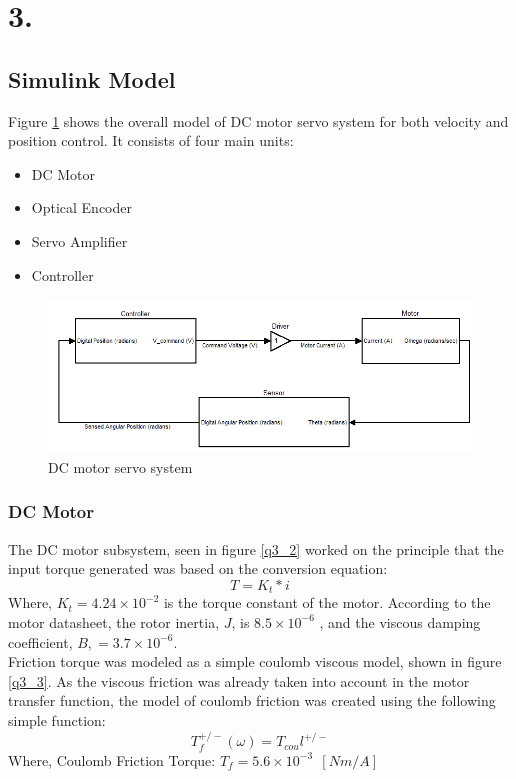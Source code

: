 \documentclass{article}
\theoremstyle{plain}
\theoremstyle{definition}
\theoremstyle{remark}
\begin{document}
\clearpage

\section*{3.}
\subsection*{Simulink Model}
Figure \ref{q3_1} shows the overall model of DC motor servo system for both velocity and position control. It consists of four main units: 
\begin{itemize}
\item DC Motor
\item Optical Encoder 
\item Servo Amplifier 
\item Controller
\end{itemize}

\begin{figure}[htb]
\begin{center}
\includegraphics[width = 14cm]{q3_1}
\caption{DC motor servo system}
\label{q3_1}
\end{center}
\end{figure}

\clearpage

\subsubsection*{DC Motor}
The DC motor subsystem, seen in figure \ref{q3_2} worked on the principle that the input torque generated was based on the conversion equation: 
$$T = K_t*i$$
Where, $K_t = 4.24\times10^{-2}$  is the torque constant of the motor. According to the motor datasheet, the rotor inertia, $J$, is $8.5 \times 10^{-6}$ , and the viscous damping coefficient, $B, =3.7\times10^{-6}$.\\

Friction torque was modeled as a simple coulomb viscous model, shown in figure \ref{q3_3}. As the viscous friction was already taken into account in the motor transfer function, the model of coulomb friction was created using the following simple function: 
$$T_f^{+/-} (\omega) =T_{cou}l^{+/-}$$
Where,  Coulomb Friction Torque: $ T_f = 5.6\times 10^{-3} \ \  [Nm/A]$
\end{document}
